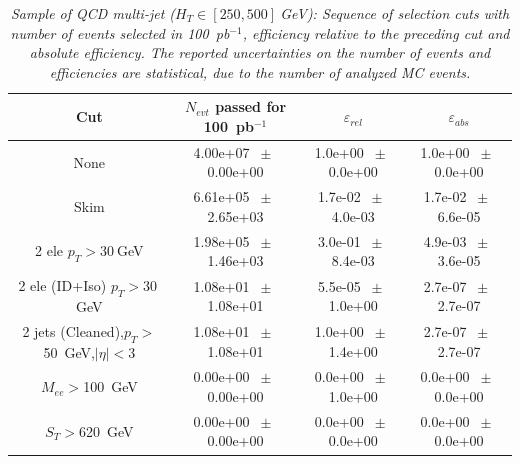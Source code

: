 \begin{table}[htbp] 
\begin{center} 
\begin{tabular}{|c|c|c|c|} 
\hline\hline 
 Cut & $N_{evt}$ passed for 100~pb$^{-1}$ & $\varepsilon_{rel}$ & $\varepsilon_{abs}$ \\ 
\hline\hline 
None       &        4.00e+07       $~\pm~$       0.00e+00        &        1.0e+00       $~\pm~$       0.0e+00        &        1.0e+00       $~\pm~$       0.0e+00       \\       
       Skim       &        6.61e+05       $~\pm~$       2.65e+03        &        1.7e-02       $~\pm~$       4.0e-03        &        1.7e-02       $~\pm~$       6.6e-05       \\       
       2 ele $p_T>30~$GeV       &        1.98e+05       $~\pm~$       1.46e+03        &        3.0e-01       $~\pm~$       8.4e-03        &        4.9e-03       $~\pm~$       3.6e-05       \\       
       2 ele (ID+Iso) $p_T>30~$GeV       &        1.08e+01       $~\pm~$       1.08e+01        &        5.5e-05       $~\pm~$       1.0e+00        &        2.7e-07       $~\pm~$       2.7e-07       \\       
       2 jets (Cleaned),$p_T>$50~GeV,$|\eta|<$3       &        1.08e+01       $~\pm~$       1.08e+01        &        1.0e+00       $~\pm~$       1.4e+00        &        2.7e-07       $~\pm~$       2.7e-07       \\       
       $M_{ee}>$100~GeV       &        0.00e+00       $~\pm~$       0.00e+00        &        0.0e+00       $~\pm~$       1.0e+00        &        0.0e+00       $~\pm~$       0.0e+00       \\       
       $S_T>$620~GeV       &        0.00e+00       $~\pm~$       0.00e+00        &        0.0e+00       $~\pm~$       0.0e+00        &        0.0e+00       $~\pm~$       0.0e+00       \\       
       \hline\hline 
\end{tabular} 
\end{center} 
\caption{\small \sl Sample of QCD multi-jet ($H_T \in [250,500]~$GeV): Sequence of selection cuts with number of events selected in 100~pb$^{-1}$, efficiency relative to the preceding cut and absolute efficiency. The reported uncertainties on the number of events and efficiencies are statistical, due to the number of analyzed MC events.} 
\label{tab:effic-QCD-250-500} 
\end{table} 

